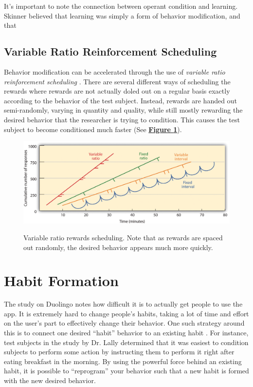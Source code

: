 \par It's important to note the connection between operant condition and learning. Skinner believed that learning was simply a form of behavior modification, and that 

\par 


\subsection{Variable Ratio Reinforcement Scheduling}
 Behavior modification can be accelerated through the use of \textit{variable ratio reinforcement scheduling }\cite{ferster1957schedules}. There are several different ways of scheduling the rewards  where rewards are not actually doled out on a regular basis exactly according to the behavior of the test subject. Instead, rewards are handed out semi-randomly, varying in quantity and quality, while still mostly rewarding the desired behavior that the researcher is trying to condition. This causes the test subject to become conditioned much faster (See \textbf{\hyperref[fig:variable_ratio]{Figure \ref*{fig:variable_ratio}}}).
 
 \begin{figure}[h]
 	\includegraphics[width=1.0\linewidth]{figures/variable_ratio}
 	\caption{Variable ratio rewards scheduling. Note that as rewards are spaced out randomly, the desired behavior appears much more quickly.}
 	\label{fig:variable_ratio}
 	\cite{hardy_heyes_1999}
 \end{figure}

\section{Habit Formation}



The study on Duolingo notes how difficult it is to actually get people to use the app. It is extremely hard to change people's habits, taking a lot of time and effort on the user's part to effectively change their behavior. One such strategy around this is to connect one desired ``habit'' behavior to an existing habit \cite{lally2010habits}. For instance, test subjects in the study by Dr. Lally determined that it was easiest to condition subjects to perform some action by instructing them to perform it right after eating breakfast in the morning. By using the powerful force behind an existing habit, it is possible to ``reprogram'' your behavior such that a new habit is formed with the new desired behavior.

